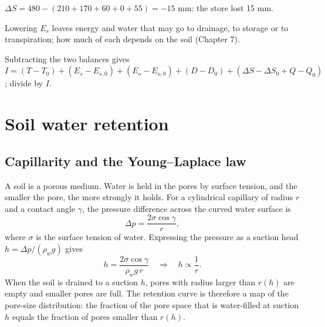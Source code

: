\sol  $\Delta S=480-(210+170+60+0+55)=-15$ mm: the store lost 15 mm.

\sol  Lowering $E_s$ leaves energy and water that may go to drainage, to storage or to transpiration; how much of each depends on the soil (Chapter 7).

\sol  Subtracting the two balances gives $I=(T-T_0)+(E_s-E_{s,0})+(E_o-E_{o,0})+(D-D_0)+(\Delta S-\Delta S_0+Q-Q_0)$; divide by $I$.


\chapter{Soil water retention}

\section{Capillarity and the Young--Laplace law}
A soil is a porous medium. Water is held in the pores by surface tension, and the smaller the pore, the more strongly it holds. For a cylindrical capillary of radius $r$ and a contact angle $\gamma$, the pressure difference across the curved water surface is
\begin{equation}\label{eq:yl}\boxed{\Delta p = \frac{2\sigma\cos\gamma}{r},}\end{equation}
where $\sigma$ is the surface tension of water. Expressing the pressure as a suction head $h = \Delta p/(\rho_w g)$ gives
\begin{equation}\label{eq:hr}\boxed{h = \frac{2\sigma\cos\gamma}{\rho_w g\, r}\quad\Longrightarrow\quad h\propto \frac1r .}\end{equation}
When the soil is drained to a suction $h$, pores with radius larger than $r(h)$ are empty and smaller pores are full. The retention curve is therefore a map of the pore-size distribution: the fraction of the pore space that is water-filled at suction $h$ equals the fraction of pores smaller than $r(h)$.

